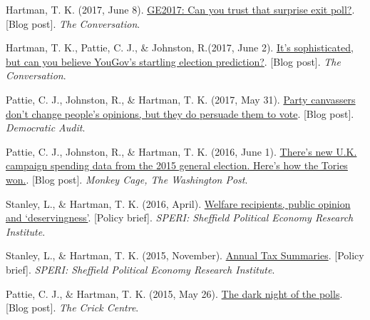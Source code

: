 \documentclass[12pt]{article}
\begin{document}
\begin{bibenum}
        \item Hartman, T. K. (2017, June 8). 
    \href{https://theconversation.com/ge2017-can-you-trust-that-surprise-exit-poll-79170}
    {GE2017: Can you trust that surprise exit poll?}. [Blog post]. 
    \textit{The Conversation}.

    \item Hartman, T. K., Pattie, C. J., \& Johnston, R.(2017, June 2). 
    \href{https://theconversation.com/its-sophisticated-but-can-you-believe-yougovs-startling-election-prediction-78701}
    {It's sophisticated, but can you believe YouGov's startling election prediction?}. [Blog post]. 
    \textit{The Conversation}.

	\item Pattie, C. J., Johnston, R., \& Hartman, T. K. (2017, May 31). 
	\href{http://www.democraticaudit.com/2017/05/31/party-canvassers-dont-change-peoples-opinions-but-they-do-persuade-them-to-vote/}{Party canvassers don't change people's opinions, but they do persuade them to vote}. [Blog post]. \textit{Democratic Audit}. 

    \item Pattie, C. J., Johnston, R., \& Hartman, T. K. (2016, June 1). 
    \href{https://www.washingtonpost.com/news/monkey-cage/wp/2016/06/01/theres-new-u-k-campaign-spending-data-from-the-2015-general-election-heres-how-the-tories-won/}
    {There's new U.K. campaign spending data from the 2015 general election. Here's how the Tories won.}. [Blog post]. 
    \textit{Monkey Cage, The Washington Post}.   

    \item Stanley, L., \& Hartman, T. K. (2016, April). 
    \href{http://speri.dept.shef.ac.uk/wp-content/uploads/2016/04/Brief-22-Welfare-recipients-public-opinion-and-deservingness.pdf}
    {Welfare recipients, public opinion and `deservingness'}. [Policy brief]. 
    \textit{SPERI: Sheffield Political Economy Research Institute}.  

    \item Stanley, L., \& Hartman, T. K. (2015, November). 
    \href{http://speri.dept.shef.ac.uk/wp-content/uploads/2015/11/Brief16-The-UK-annual-tax-summaries.pdf}
    {Annual Tax Summaries}. [Policy brief]. 
    \textit{SPERI: Sheffield Political Economy Research Institute}.  
        
    \item Pattie, C. J., \& Hartman, T. K. (2015, May 26). 
    \href{http://www.crickcentre.org/blog/the-dark-night-of-the-polls/}
    {The dark night of the polls}. [Blog post]. 
    \textit{The Crick Centre}.   
   

\end{bibenum}
\end{document}
